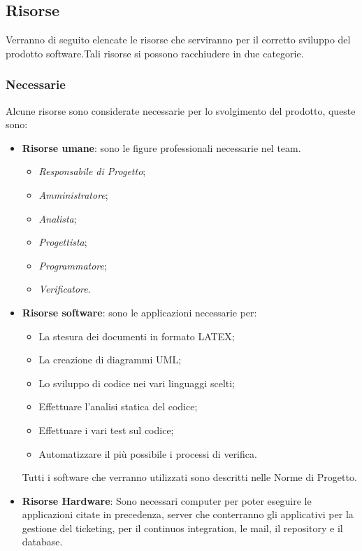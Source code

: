 \subsection{Risorse}
Verranno di seguito elencate le risorse che serviranno per il corretto sviluppo del prodotto software.Tali risorse si possono racchiudere in due categorie.

\subsubsection{Necessarie}
Alcune risorse sono considerate necessarie per lo svolgimento del prodotto, queste sono:
\begin{itemize}
\item \textbf{Risorse umane}: sono le figure professionali necessarie nel team.
\begin{itemize}
\item[\-] \textit{Responsabile di Progetto};
\item[\-] \textit{Amministratore};
\item[\-] \textit{Analista};
\item[\-] \textit{Progettista};
\item[\-] \textit{Programmatore};
\item[\-] \textit{Verificatore}.
\end{itemize}
\item \textbf{Risorse software}: sono le applicazioni necessarie per:
\begin{itemize}
\item[\-] La stesura dei documenti in formato LATEX; 
\item[\-] La creazione di diagrammi UML;
\item[\-] Lo sviluppo di codice nei vari linguaggi scelti;
\item[\-] Effettuare l'analisi statica del codice;
\item[\-] Effettuare i vari test sul codice;
\item[\-] Automatizzare il più possibile i processi di verifica.
\end{itemize}
Tutti i software che verranno utilizzati sono descritti nelle Norme di Progetto.
\item \textbf{Risorse Hardware}: Sono necessari computer per poter eseguire le applicazioni citate in precedenza, server che conterranno gli applicativi per la gestione del ticketing, per il continuos integration, le mail, il repository e il database.
\end{itemize}

